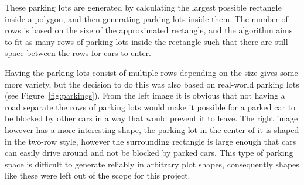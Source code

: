 These parking lots are generated by calculating the largest possible rectangle inside a polygon, and then generating parking lots inside them.
The number of rows is based on the size of the approximated rectangle, and the algorithm aims to fit as many rows of parking lots inside the rectangle such that there are still space between the rows for cars to enter.

Having the parking lots consist of multiple rows depending on the size gives some more variety, but the decision to do this was also based on real-world parking lots (see Figure~\ref{fig:parkings}).
From the left image it is obvious that not having a road separate the rows of parking lots would make it possible for a parked car to be blocked by other cars in a way that would prevent it to leave.
The right image however has a more interesting shape, the parking lot in the center of it is shaped in the two-row style, however the surrounding rectangle is large enough that cars can easily drive around and not be blocked by parked cars.
This type of parking space is difficult to generate reliably in arbitrary plot shapes, consequently shapes like these were left out of the scope for this project.
